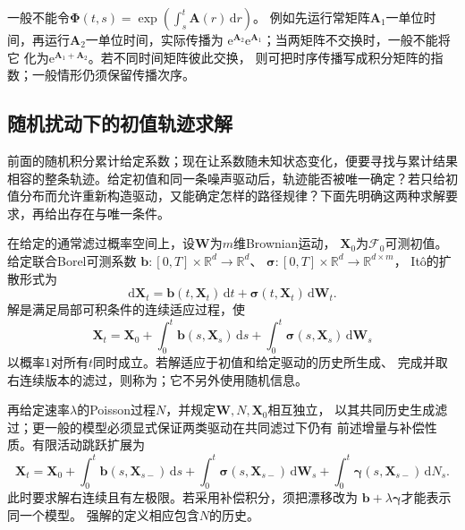 一般不能令$\bm\Phi(t,s)=\exp(\int_s^t\bm A(r)\,\mathrm dr)$。
例如先运行常矩阵$\bm A_1$一单位时间，再运行$\bm A_2$一单位时间，实际传播为
$\mathrm e^{\bm A_2}\mathrm e^{\bm A_1}$；当两矩阵不交换时，一般不能将它
化为$\mathrm e^{\bm A_1+\bm A_2}$。若不同时间矩阵彼此交换，
则可把时序传播写成积分矩阵的指数；一般情形仍须保留传播次序。

\subsection{随机扰动下的初值轨迹求解}
\label{sec:action-state-random-trajectory-solve}
前面的随机积分累计给定系数；现在让系数随未知状态变化，便要寻找与累计结果相容的整条轨迹。给定初值和同一条噪声驱动后，轨迹能否被唯一确定？若只给初值分布而允许重新构造驱动，又能确定怎样的路径规律？下面先明确这两种求解要求，再给出存在与唯一条件。

\begin{definition}[Itô随机微分方程与强解]
  \label{def:dynamical-ito-sde-strong-solution}
  在给定的通常滤过概率空间上，设$\bm W$为$m$维Brownian运动，
  $\bm X_0$为$\mathcal F_0$可测初值。给定联合Borel可测系数
  $\bm b:[0,T]\times\mathbb R^d\to\mathbb R^d$、
  $\bm\sigma:[0,T]\times\mathbb R^d\to\mathbb R^{d\times m}$，
  Itô的扩散形式为
  \begin{equation}
    \mathrm d\bm X_t=\bm b(t,\bm X_t)\,\mathrm dt
                  +\bm\sigma(t,\bm X_t)\,\mathrm d\bm W_t.
    \label{eq:dynamical-ito-sde}
  \end{equation}
  解是满足局部可积条件的连续适应过程，使
  \[
    \bm X_t=\bm X_0+\int_0^t\bm b(s,\bm X_s)\,\mathrm ds
                  +\int_0^t\bm\sigma(s,\bm X_s)\,\mathrm d\bm W_s
  \]
  以概率$1$对所有$t$同时成立。若解适应于初值和给定驱动的历史所生成、
  完成并取右连续版本的滤过，则称为；它不另外使用随机信息。
\end{definition}

再给定速率$\lambda$的Poisson过程$N$，并规定$\bm W,N,\bm X_0$相互独立，
以其共同历史生成滤过；更一般的模型必须显式保证两类驱动在共同滤过下仍有
前述增量与补偿性质。有限活动跳跃扩展为
\begin{equation}
 \bm X_t=\bm X_0+\int_0^t\bm b(s,\bm X_{s-})\,\mathrm ds
      +\int_0^t\bm\sigma(s,\bm X_{s-})\,\mathrm d\bm W_s
      +\int_0^t\bm\gamma(s,\bm X_{s-})\,\mathrm dN_s.
 \label{eq:action-state-jump-sde}
\end{equation}
此时要求解右连续且有左极限。若采用补偿积分，须把漂移改为
$\bm b+\lambda\bm\gamma$才能表示同一个模型。
强解的定义相应包含$N$的历史。

